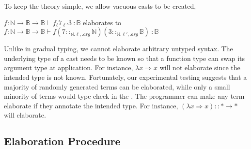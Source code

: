 To keep the theory simple, we allow vacuous casts to be created,
\begin{example}
$f:\mathbb{N}\rightarrow\mathbb{B}\rightarrow\mathbb{B}\vdash f_{\ell}7_{\ell'}3\ :\mathbb{B}$ elaborates to $f:\mathbb{N}\rightarrow\mathbb{B}\rightarrow\mathbb{B}\vdash f\left(7::_{\mathbb{N}.\ell,.arg}\mathbb{N}\right)\left(3::_{\mathbb{N}.\ell',.arg}\mathbb{B}\right)\ :\mathbb{B}$
\end{example}


Unlike in gradual typing, we cannot elaborate arbitrary untyped syntax.
The underlying type of a cast needs to be known so that a function type can swap its argument type at application.
For instance, $\lambda x\Rightarrow x$ will not elaborate since the intended type is not known.
Fortunately, our experimental testing suggests that a majority of randomly generated terms can be elaborated, while only a small minority of terms would type check in the \slang{}.
The programmer can make any term elaborate if they annotate the intended type.
For instance, $\left(\lambda x\Rightarrow x\right)::*\rightarrow*$ will elaborate.

\subsection{Elaboration Procedure}


